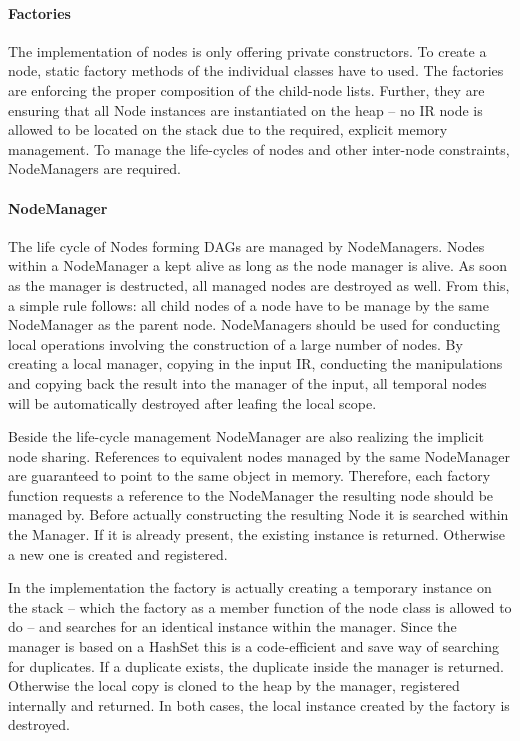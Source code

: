 \paragraph{Factories}  The implementation of nodes is only
offering private constructors. To create a node, static factory methods of the
individual classes have to used. The factories are enforcing the proper
composition of the child-node lists. Further, they are ensuring that all Node
instances are instantiated on the heap -- no IR node is allowed to be located on
the stack due to the required, explicit memory management. To manage the
life-cycles of nodes and other inter-node constraints, NodeManagers are
required.

\paragraph{NodeManager}  The life cycle of Nodes forming
DAGs are managed by NodeManagers. Nodes within a NodeManager a kept alive as
long as the node manager is alive. As soon as the manager is destructed, all
managed nodes are destroyed as well. From this, a simple rule follows: all child
nodes of a node have to be manage by the same NodeManager as the parent node.
NodeManagers should be used for conducting local operations involving the
construction of a large number of nodes. By creating a local manager, copying in
the input IR, conducting the manipulations and copying back the result into the
manager of the input, all temporal nodes will be automatically destroyed
after leafing the local scope.

Beside the life-cycle management NodeManager are also realizing the implicit
node sharing. References to equivalent nodes managed by the same NodeManager are
guaranteed to point to the same object in memory. Therefore, each factory
function requests a reference to the NodeManager the resulting node should be
managed by. Before actually constructing the resulting Node it is searched
within the Manager. If it is already present, the existing instance is returned.
Otherwise a new one is created and registered.

In the implementation the factory is actually creating a temporary instance on
the stack -- which the factory as a member function of the node class is
allowed to do -- and searches for an identical instance within the manager.
Since the manager is based on a HashSet this is a code-efficient and save way of
searching for duplicates. If a duplicate exists, the duplicate inside the
manager is returned. Otherwise the local copy is cloned to the heap by the
manager, registered internally and returned. In both cases, the local instance
created by the factory is destroyed.


